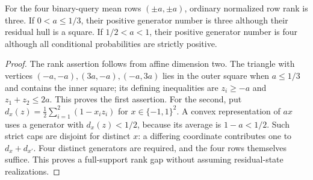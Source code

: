\begin{proposition}
\label{prop:squares}
For the four binary-query mean rows $(\pm a,\pm a)$, ordinary normalized
row rank is three. If $0<a\le1/3$, their positive generator number is
three although their residual hull is a square. If $1/2<a<1$, their
positive generator number is four although all conditional probabilities
are strictly positive.
\end{proposition}
\begin{proof}
The rank assertion follows from affine dimension two. The triangle with
vertices $(-a,-a),(3a,-a),(-a,3a)$ lies in the outer square when
$a\le1/3$ and contains the inner square; its defining inequalities are
$z_i\ge-a$ and $z_1+z_2\le2a$. This proves the first assertion.
For the second, put $d_x(z)=\frac12\sum_{i=1}^2(1-x_i z_i)$ for
$x\in\{-1,1\}^2$. A convex representation of $a x$ uses a generator
with $d_x(z)<1/2$, because its average is $1-a<1/2$. Such strict caps
are disjoint for distinct $x$: a differing coordinate contributes one
to $d_x+d_{x'}$. Four distinct generators are required, and the four
rows themselves suffice. This proves a full-support rank gap without
assuming residual-state realizations.
\end{proof}
